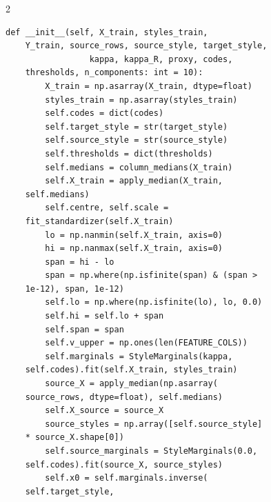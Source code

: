 \begin{multicols}{2}
\begin{Verbatim}[fontsize=\scriptsize]
    def __init__(self, X_train, styles_train,
    Y_train, source_rows, source_style, target_style,
                 kappa, kappa_R, proxy, codes,
    thresholds, n_components: int = 10):
        X_train = np.asarray(X_train, dtype=float)
        styles_train = np.asarray(styles_train)
        self.codes = dict(codes)
        self.target_style = str(target_style)
        self.source_style = str(source_style)
        self.thresholds = dict(thresholds)
        self.medians = column_medians(X_train)
        self.X_train = apply_median(X_train,
    self.medians)
        self.centre, self.scale =
    fit_standardizer(self.X_train)
        lo = np.nanmin(self.X_train, axis=0)
        hi = np.nanmax(self.X_train, axis=0)
        span = hi - lo
        span = np.where(np.isfinite(span) & (span >
    1e-12), span, 1e-12)
        self.lo = np.where(np.isfinite(lo), lo, 0.0)
        self.hi = self.lo + span
        self.span = span
        self.v_upper = np.ones(len(FEATURE_COLS))
        self.marginals = StyleMarginals(kappa,
    self.codes).fit(self.X_train, styles_train)
        source_X = apply_median(np.asarray(
    source_rows, dtype=float), self.medians)
        self.X_source = source_X
        source_styles = np.array([self.source_style]
    * source_X.shape[0])
        self.source_marginals = StyleMarginals(0.0,
    self.codes).fit(source_X, source_styles)
        self.x0 = self.marginals.inverse(
    self.target_style,


\end{Verbatim}
\end{multicols}
